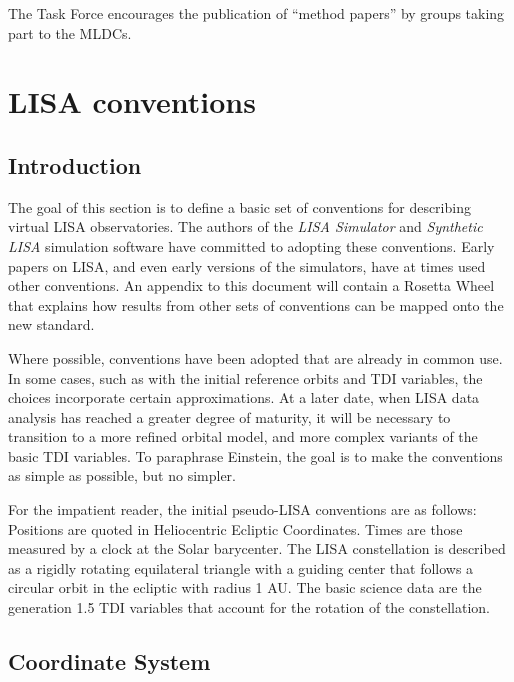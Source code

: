 \documentclass[11pt]{report}
\begin{document}
The Task Force encourages the publication of ``method papers'' by groups taking part to the MLDCs. 







%
%
%
\chapter{LISA conventions}

\section{Introduction}
\label{sec:intro}

The goal of this section is to define a basic set of conventions for describing virtual LISA observatories.
The authors of the \emph{LISA Simulator} and \emph{Synthetic LISA} simulation software have committed to
adopting these conventions. Early papers on LISA, and even early versions of the simulators, have at times
used other conventions. An appendix to this document will contain a Rosetta Wheel that explains how
results from other sets of conventions can be mapped onto the new standard.

Where possible, conventions have been adopted that are already in common use. In some cases, such as with the
initial reference orbits and TDI variables, the choices incorporate certain approximations.
At a later date, when LISA data analysis has reached a greater degree of maturity, it will be necessary to
transition to a more refined orbital model, and more complex variants of the basic TDI variables. To paraphrase
Einstein, the goal is to make the conventions as simple as possible, but no simpler.

For the impatient reader, the initial pseudo-LISA conventions are as follows: Positions are quoted in 
Heliocentric Ecliptic Coordinates. Times are those measured by a clock at the Solar barycenter. The
LISA constellation is described as a rigidly rotating equilateral triangle with a guiding center
that follows a circular orbit in the ecliptic with radius 1 AU. The basic science data are the
generation 1.5 TDI variables that account for the rotation of the constellation.

\section{Coordinate System}
\label{sec:coordinates}
\end{document}
